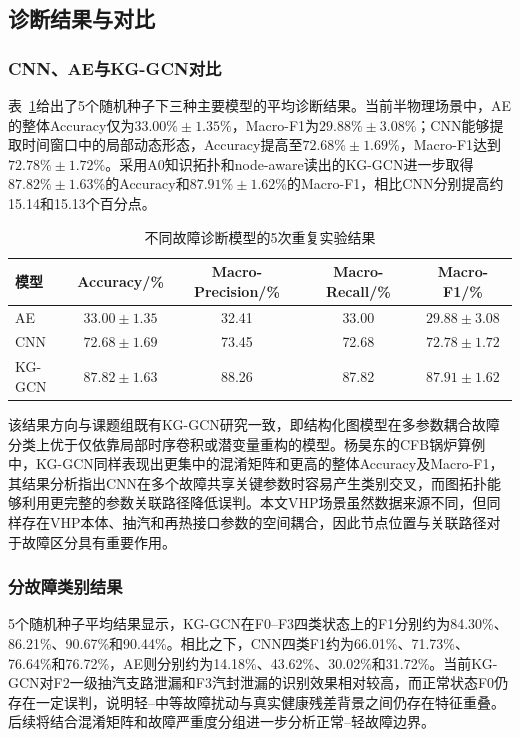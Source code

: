 \subsection{诊断结果与对比}
\label{subsec:pilot_results_v2}

\subsubsection{CNN、AE与KG-GCN对比}

表~\ref{tab:main_result_v2}给出了5个随机种子下三种主要模型的平均诊断结果。当前半物理场景中，AE的整体Accuracy仅为$33.00\%\pm1.35\%$，Macro-F1为$29.88\%\pm3.08\%$；CNN能够提取时间窗口中的局部动态形态，Accuracy提高至$72.68\%\pm1.69\%$，Macro-F1达到$72.78\%\pm1.72\%$。采用A0知识拓扑和node-aware读出的KG-GCN进一步取得$87.82\%\pm1.63\%$的Accuracy和$87.91\%\pm1.62\%$的Macro-F1，相比CNN分别提高约15.14和15.13个百分点。

\begin{table}[htbp]
    \centering
    \caption{不同故障诊断模型的5次重复实验结果}
    \label{tab:main_result_v2}
    \begin{tabular}{lcccc}
        \toprule
        模型 & Accuracy/\% & Macro-Precision/\% & Macro-Recall/\% & Macro-F1/\% \\
        \midrule
        AE & $33.00\pm1.35$ & 32.41 & 33.00 & $29.88\pm3.08$ \\
        CNN & $72.68\pm1.69$ & 73.45 & 72.68 & $72.78\pm1.72$ \\
        KG-GCN & $87.82\pm1.63$ & 88.26 & 87.82 & $87.91\pm1.62$ \\
        \bottomrule
    \end{tabular}
\end{table}

该结果方向与课题组既有KG-GCN研究一致，即结构化图模型在多参数耦合故障分类上优于仅依靠局部时序卷积或潜变量重构的模型。杨昊东的CFB锅炉算例中，KG-GCN同样表现出更集中的混淆矩阵和更高的整体Accuracy及Macro-F1，其结果分析指出CNN在多个故障共享关键参数时容易产生类别交叉，而图拓扑能够利用更完整的参数关联路径降低误判\cite{YangHaodong2026CFB}。本文VHP场景虽然数据来源不同，但同样存在VHP本体、抽汽和再热接口参数的空间耦合，因此节点位置与关联路径对于故障区分具有重要作用。

\subsubsection{分故障类别结果}

5个随机种子平均结果显示，KG-GCN在F0--F3四类状态上的F1分别约为84.30\%、86.21\%、90.67\%和90.44\%。相比之下，CNN四类F1约为66.01\%、71.73\%、76.64\%和76.72\%，AE则分别约为14.18\%、43.62\%、30.02\%和31.72\%。当前KG-GCN对F2一级抽汽支路泄漏和F3汽封泄漏的识别效果相对较高，而正常状态F0仍存在一定误判，说明轻--中等故障扰动与真实健康残差背景之间仍存在特征重叠。后续将结合混淆矩阵和故障严重度分组进一步分析正常--轻故障边界。

